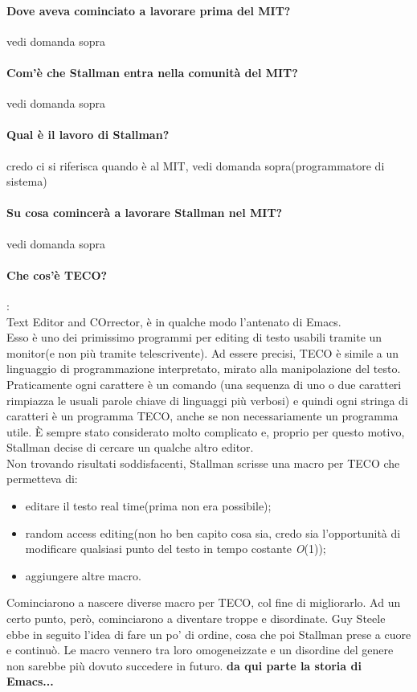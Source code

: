 \documentclass[a4paper]{article}
\begin{document}
		\paragraph{Dove aveva cominciato a lavorare prima del MIT?}
		vedi domanda sopra
		\paragraph{Com'è che Stallman entra nella comunità del MIT?}
		vedi domanda sopra
		\paragraph{Qual è il lavoro di Stallman?}
		credo ci si riferisca quando è al MIT, vedi domanda sopra(programmatore di sistema)
		\paragraph{Su cosa comincerà a lavorare Stallman nel MIT?}
		vedi domanda sopra
		\paragraph{Che cos'è TECO?}: \\
		Text Editor and COrrector, è in qualche modo l'antenato di Emacs.\\
		Esso è uno dei primissimo programmi per editing di testo usabili tramite un monitor(e non più tramite telescrivente). Ad essere precisi, TECO è simile a un linguaggio di programmazione interpretato, mirato alla manipolazione del testo. Praticamente ogni carattere è un comando (una sequenza di uno o due caratteri rimpiazza le usuali parole chiave di linguaggi più verbosi) e quindi ogni stringa di caratteri è un programma TECO, anche se non necessariamente un programma utile. È sempre stato considerato molto complicato e, proprio per questo motivo, Stallman decise di cercare un qualche altro editor. \\
		Non trovando risultati soddisfacenti, Stallman scrisse una macro per TECO che permetteva di:
		\begin{itemize}
			\item editare il testo real time(prima non era possibile);
			\item random access editing(non ho ben capito cosa sia, credo sia l'opportunità di modificare qualsiasi punto del testo in tempo costante \textit{O}(1));
			\item aggiungere altre macro.
		\end{itemize}
		Cominciarono a nascere diverse macro per TECO, col fine di migliorarlo.
		Ad un certo punto, però, cominciarono a diventare troppe e disordinate. Guy Steele ebbe in seguito l'idea di fare un po' di ordine, cosa che poi Stallman prese a cuore e continuò. Le macro vennero tra loro omogeneizzate e un disordine del genere non sarebbe più dovuto succedere in futuro. \textbf{da qui parte la storia di Emacs...}
	
\end{document}

